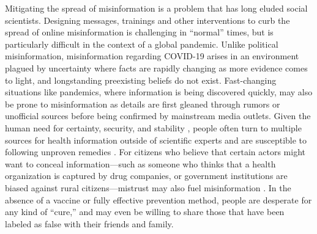 \documentclass[letterpaper, 12pt, parskip=full,DIV=10]{scrartcl}
\begin{document}
Mitigating the spread of misinformation is a problem that has long eluded social scientists. Designing messages, trainings and other interventions to curb the spread of online misinformation is challenging in ``normal'' times, but is particularly difficult in the context of a global pandemic. Unlike political misinformation, misinformation regarding COVID-19 arises in an environment plagued by uncertainty where facts are rapidly changing as more evidence comes to light, and longstanding preexisting beliefs do not exist. Fast-changing situations like pandemics, where information is being discovered quickly, may also be prone to misinformation as details are first gleaned through rumors or unofficial sources before being confirmed by mainstream media outlets. Given the human need for certainty, security, and stability \citep{leotti2010born}, people often turn to multiple sources for health information outside of scientific experts and are susceptible to following unproven remedies \citep{swire2020public}. For citizens who believe that certain actors might want to conceal information---such as someone who thinks that a health organization is captured by drug companies, or government institutions are biased against rural citizens---mistrust may also fuel misinformation \citep{vinck2019institutional}. In the absence of a vaccine or fully effective prevention method, people are desperate for any kind of ``cure,'' and may even be willing to share those that have been labeled as false with their friends and family. %




\end{document}
